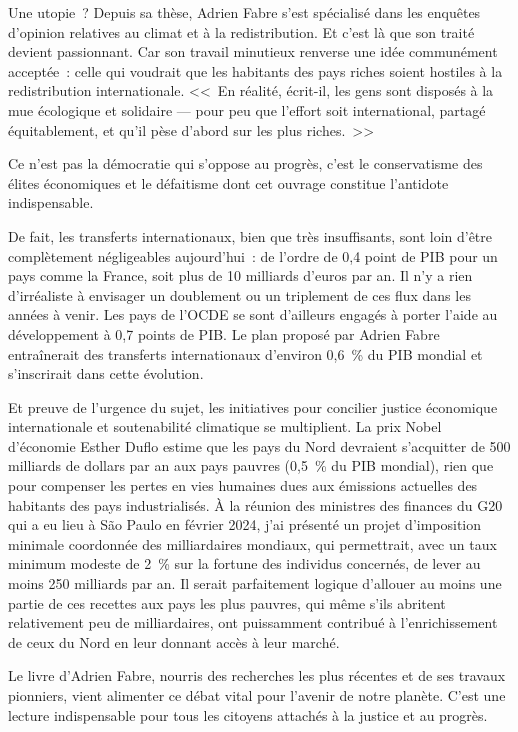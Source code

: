 \documentclass[a5paper,french,openany]{memoir}
\begin{document}
Une utopie~? Depuis sa thèse, Adrien Fabre s'est spécialisé dans les enquêtes d'opinion relatives au climat et à la redistribution. Et c'est là que son traité devient passionnant. Car son travail minutieux renverse une idée communément acceptée~: celle qui voudrait que les habitants des pays riches soient hostiles à la redistribution internationale. <<~En réalité, écrit-il, les gens sont disposés à la mue écologique et solidaire — pour peu que l'effort soit international, partagé équitablement, et qu'il pèse d'abord sur les plus riches.~>> 

Ce n'est pas la démocratie qui s'oppose au progrès, c'est le conservatisme des élites économiques et le défaitisme dont cet ouvrage constitue l'antidote indispensable.

De fait, les transferts internationaux, bien que très insuffisants, sont loin d'être complètement négligeables aujourd'hui~: de l'ordre de 0,4 point de PIB pour un pays comme la France, soit plus de 10 milliards d'euros par an. Il n'y a rien d'irréaliste à envisager un doublement ou un triplement de ces flux dans les années à venir. Les pays de l'OCDE se sont d'ailleurs engagés à porter l'aide au développement à 0,7 points de PIB. Le plan proposé par Adrien Fabre entraînerait des transferts internationaux d'environ 0,6~\% du PIB mondial et s'inscrirait dans cette évolution. 

Et preuve de l'urgence du sujet, les initiatives pour concilier justice économique internationale et soutenabilité climatique se multiplient. La prix Nobel d'économie Esther Duflo estime que les pays du Nord devraient s'acquitter de 500 milliards de dollars par an aux pays pauvres (0,5~\% du PIB mondial), rien que pour compenser les pertes en vies humaines dues aux émissions actuelles des habitants des pays industrialisés. À la réunion des ministres des finances du G20 qui a eu lieu à São Paulo en février 2024, j'ai présenté un projet d'imposition minimale coordonnée des milliardaires mondiaux, qui permettrait, avec un taux minimum modeste de 2~\% sur la fortune des individus concernés, de lever au moins 250 milliards par an. Il serait parfaitement logique d'allouer au moins une partie de ces recettes aux pays les plus pauvres, qui même s'ils abritent relativement peu de milliardaires, ont puissamment contribué à l'enrichissement de ceux du Nord en leur donnant accès à leur marché. 

Le livre d'Adrien Fabre, nourris des recherches les plus récentes et de ses travaux pionniers, vient alimenter ce débat vital pour l'avenir de notre planète. C'est une lecture indispensable pour tous les citoyens attachés à la justice et au progrès.
\end{document}
